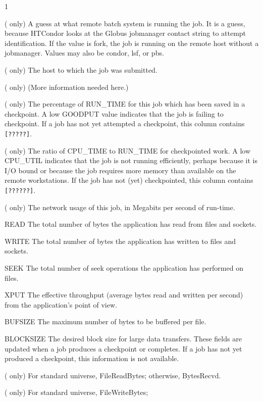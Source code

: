 \begin{ManPage}{\label{man-condor-q}}{1}
\begin{description}
  ( only) A guess at what remote batch system is running the job.
  It is a guess, because HTCondor looks at the Globus jobmanager contact
  string to attempt identification.
  If the value is fork, the job is running on the
  remote host without a jobmanager.
  Values may also be condor, lsf, or pbs.
\item[HOST] ( only) The host to which the job was submitted.
\item[GRID\_JOB\_ID] ( only) (More information needed here.)
\item[GOODPUT] ( only) The percentage of RUN\_TIME for this job which has been
  saved in a checkpoint.  A low GOODPUT value indicates that the job is
  failing to checkpoint.  If a job has not yet attempted a checkpoint,
  this column contains \texttt{[?????]}.
\item[CPU\_UTIL] ( only) The ratio of CPU\_TIME to RUN\_TIME for checkpointed
  work.  A low CPU\_UTIL indicates that the job is not running
  efficiently, perhaps because it is I/O bound or because the job
  requires more memory than available on the remote workstations.  If
  the job has not (yet) checkpointed, this column contains \texttt{[??????]}.
\item[Mb/s] ( only) The network usage of this job, in
  Megabits per second of run-time.
  \item{READ} The total number of bytes the application has read from
    files and sockets.
  \item{WRITE} The total number of bytes the application has written to
    files and sockets.
  \item{SEEK} The total number of seek operations the application has
    performed on files.
  \item{XPUT} The effective throughput (average bytes read and written
    per second)
  from the application's point of view.
  \item{BUFSIZE} The maximum number of bytes to be buffered per file.
  \item{BLOCKSIZE} The desired block size for large data transfers.
    These fields are updated when a job produces a checkpoint or completes.
    If a job has not yet produced a checkpoint, this information is not
    available.
\item[INPUT] ( only) For standard universe, FileReadBytes;
    otherwise, BytesRecvd.
\item[OUTPUT] ( only) For standard universe, FileWriteBytes;

\end{description}
\end{ManPage}
